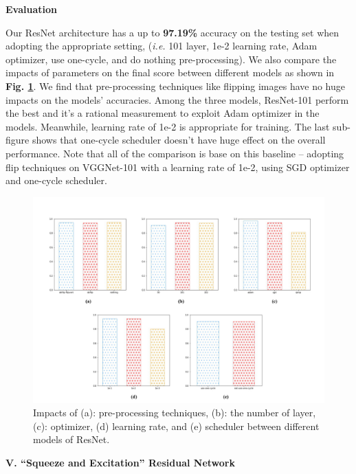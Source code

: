 \documentclass[a4paper]{article}
\begin{document}
\vspace{2mm}
\begin{center}
\large\textbf{Evaluation} \\
\end{center}
\large{
Our \textsf{ResNet} architecture has a up to \textbf{97.19\%} accuracy on the testing set when adopting the appropriate setting, (\textit{i.e.} 101 layer, 1e-2 learning rate, Adam optimizer, use one-cycle, and do nothing pre-processing). We also compare the impacts of parameters on the final score between different models as shown in \textbf{Fig. \ref{rescompare}}. We find that pre-processing techniques like flipping images have no huge impacts on the models' accuracies. Among the three models, \textsf{ResNet-101} perform the best and it's a rational measurement to exploit Adam optimizer in the models. Meanwhile, learning rate of 1e-2 is appropriate for training. The last sub-figure shows that one-cycle scheduler doesn't have huge effect on the overall performance. Note that all of the comparison is base on this baseline -- adopting flip techniques on \textsf{VGGNet-101} with a learning rate of 1e-2, using SGD optimizer and one-cycle scheduler.

\begin{figure}[h]
\centering
\includegraphics[width=15cm]{res.pdf}
\caption{ Impacts of (a): pre-processing techniques, (b): the number of layer, (c): optimizer, (d) learning rate, and (e) scheduler between different models of \textsf{ResNet}.}
\label{rescompare}
\end{figure}

}
\clearpage
\vspace{5mm}
\begin{center}
\LARGE\textbf{V. ``Squeeze and Excitation'' Residual Network} \\
\end{center}
\vspace{2mm}
\end{document}
